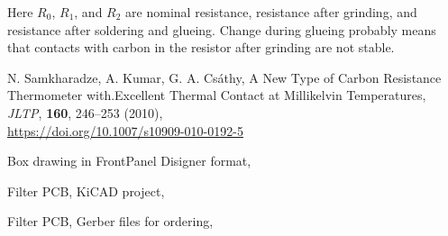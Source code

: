 \documentclass[a4paper]{article}
\begin{document}
Here $R_0$, $R_1$, and $R_2$ are nominal resistance, resistance after
grinding, and resistance after soldering and glueing. Change during
glueing probably means that contacts with carbon in the resistor
after grinding are not stable.

\begin{thebibliography}{}
N. Samkharadze, A. Kumar, G. A. Cs{\'a}thy,
A New Type of Carbon Resistance Thermometer with.Excellent Thermal Contact at Millikelvin Temperatures,
{\it JLTP}, {\bf 160}, 246--253 (2010),\\
\url{https://doi.org/10.1007/s10909-010-0192-5}

Box drawing in FrontPanel Disigner format,\\

Filter PCB, KiCAD project,\\

Filter PCB, Gerber files for ordering,\\

\end{thebibliography}
\end{document}
